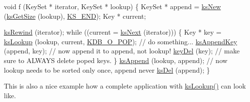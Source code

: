 \begin{DoxyCodeInclude}
\textcolor{keywordtype}{void} f (KeySet * iterator, KeySet * lookup)
\{
        KeySet * append = \hyperlink{group__keyset_ga671e1aaee3ae9dc13b4834a4ddbd2c3c}{ksNew} (\hyperlink{group__keyset_ga7474ad6b0a0fa969dbdf267ba5770eee}{ksGetSize} (lookup), \hyperlink{kdbenum_8c_a7a28fce3773b2c873c94ac80b8b4cd54}{KS\_END});
        Key * current;

        \hyperlink{group__keyset_gabe793ff51f1728e3429c84a8a9086b70}{ksRewind} (iterator);
        \textcolor{keywordflow}{while} ((current = \hyperlink{group__keyset_ga317321c9065b5a4b3e33fe1c399bcec9}{ksNext} (iterator)))
        \{
                Key * key = \hyperlink{group__keyset_gaa34fc43a081e6b01e4120daa6c112004}{ksLookup} (lookup, current, \hyperlink{group__keyset_gga98a3d6a4016c9dad9cbd1a99a9c2a45aa52fb5f2cc86773d393da62bebebf7984}{KDB\_O\_POP});
                \textcolor{comment}{// do something...}
                \hyperlink{group__keyset_gaa5a1d467a4d71041edce68ea7748ce45}{ksAppendKey} (append, key); \textcolor{comment}{// now append it to append, not lookup!}
                \hyperlink{group__key_ga3df95bbc2494e3e6703ece5639be5bb1}{keyDel} (key);                \textcolor{comment}{// make sure to ALWAYS delete poped keys.}
        \}
        \hyperlink{group__keyset_ga21eb9c3a14a604ee3a8bdc779232e7b7}{ksAppend} (lookup, append);
        \textcolor{comment}{// now lookup needs to be sorted only once, append never}
        \hyperlink{group__keyset_ga27e5c16473b02a422238c8d970db7ac8}{ksDel} (append);
\}
\end{DoxyCodeInclude}
 This is also a nice example how a complete application with \hyperlink{group__keyset_gaa34fc43a081e6b01e4120daa6c112004}{ks\+Lookup()} can look like.

